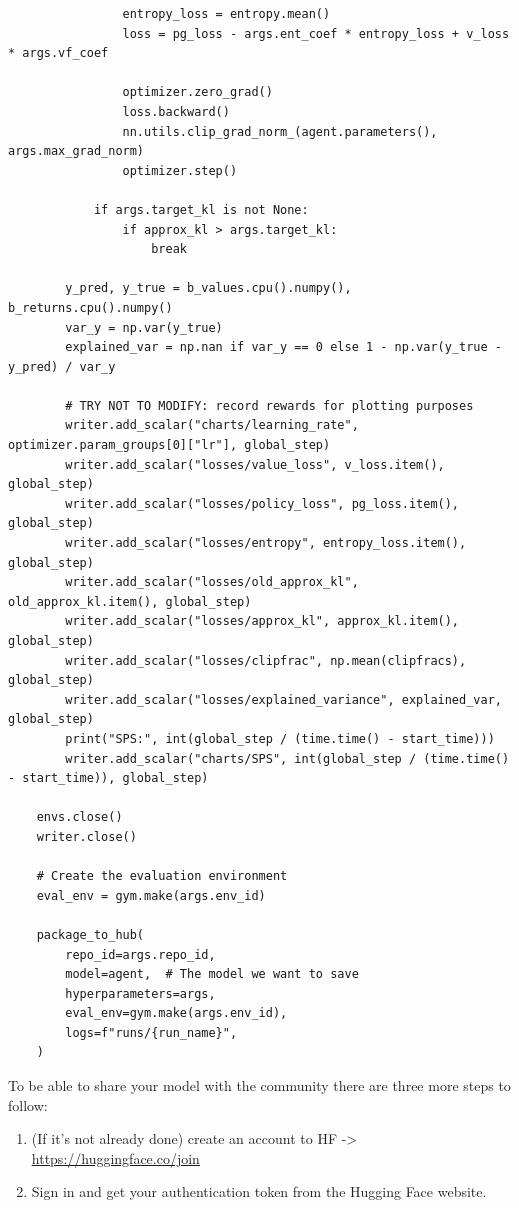 \documentclass[11pt,a4paper]{article}
\begin{document}
\begin{lstlisting}
                entropy_loss = entropy.mean()
                loss = pg_loss - args.ent_coef * entropy_loss + v_loss * args.vf_coef

                optimizer.zero_grad()
                loss.backward()
                nn.utils.clip_grad_norm_(agent.parameters(), args.max_grad_norm)
                optimizer.step()

            if args.target_kl is not None:
                if approx_kl > args.target_kl:
                    break

        y_pred, y_true = b_values.cpu().numpy(), b_returns.cpu().numpy()
        var_y = np.var(y_true)
        explained_var = np.nan if var_y == 0 else 1 - np.var(y_true - y_pred) / var_y

        # TRY NOT TO MODIFY: record rewards for plotting purposes
        writer.add_scalar("charts/learning_rate", optimizer.param_groups[0]["lr"], global_step)
        writer.add_scalar("losses/value_loss", v_loss.item(), global_step)
        writer.add_scalar("losses/policy_loss", pg_loss.item(), global_step)
        writer.add_scalar("losses/entropy", entropy_loss.item(), global_step)
        writer.add_scalar("losses/old_approx_kl", old_approx_kl.item(), global_step)
        writer.add_scalar("losses/approx_kl", approx_kl.item(), global_step)
        writer.add_scalar("losses/clipfrac", np.mean(clipfracs), global_step)
        writer.add_scalar("losses/explained_variance", explained_var, global_step)
        print("SPS:", int(global_step / (time.time() - start_time)))
        writer.add_scalar("charts/SPS", int(global_step / (time.time() - start_time)), global_step)

    envs.close()
    writer.close()

    # Create the evaluation environment
    eval_env = gym.make(args.env_id)

    package_to_hub(
        repo_id=args.repo_id,
        model=agent,  # The model we want to save
        hyperparameters=args,
        eval_env=gym.make(args.env_id),
        logs=f"runs/{run_name}",
    )
\end{lstlisting}

To be able to share your model with the community there are three more steps to follow:

\begin{enumerate}
\def\labelenumi{\arabic{enumi}.}
\item
  (If it's not already done) create an account to HF -\textgreater{} \url{https://huggingface.co/join}
\item
  Sign in and get your authentication token from the Hugging Face website.
\end{enumerate}
\end{document}
